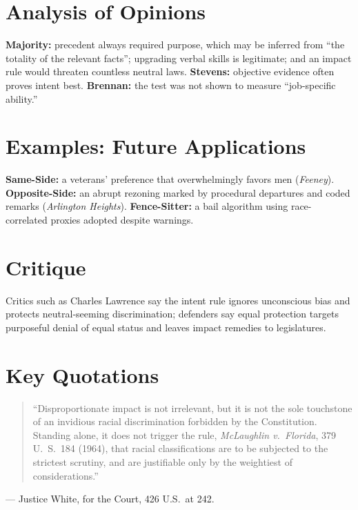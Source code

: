 \documentclass[12pt]{article}
\begin{document}
\section{Analysis of Opinions}
\textbf{Majority:} precedent always required purpose, which may be inferred from ``the totality of the relevant facts''; upgrading verbal skills is legitimate; and an impact rule would threaten countless neutral laws. \textbf{Stevens:} objective evidence often proves intent best. \textbf{Brennan:} the test was not shown to measure ``job-specific ability.''

\section{Examples: Future Applications}
\textbf{Same-Side:} a veterans' preference that overwhelmingly favors men (\textit{Feeney}). \textbf{Opposite-Side:} an abrupt rezoning marked by procedural departures and coded remarks (\textit{Arlington Heights}). \textbf{Fence-Sitter:} a bail algorithm using race-correlated proxies adopted despite warnings.

\section{Critique}
Critics such as Charles Lawrence say the intent rule ignores unconscious bias and protects neutral-seeming discrimination; defenders say equal protection targets purposeful denial of equal status and leaves impact remedies to legislatures.

\section{Key Quotations}
\begin{quote}
``Disproportionate impact is not irrelevant, but it is not the sole touchstone of an invidious racial discrimination forbidden by the Constitution. Standing alone, it does not trigger the rule, \textit{McLaughlin v.\ Florida}, 379 U.\ S.\ 184 (1964), that racial classifications are to be subjected to the strictest scrutiny, and are justifiable only by the weightiest of considerations.''
\end{quote}
\noindent --- Justice White, for the Court, 426 U.S.\ at 242.
\end{document}
